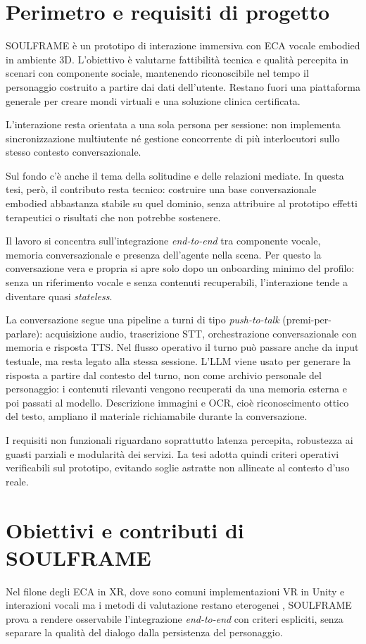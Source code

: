 \section{Perimetro e requisiti di progetto}\label{secperimetro-requisiti}
SOULFRAME è un prototipo di interazione immersiva con ECA vocale embodied in ambiente 3D. L'obiettivo è valutarne fattibilità tecnica e qualità percepita in scenari con componente sociale, mantenendo riconoscibile nel tempo il personaggio costruito a partire dai dati dell'utente. Restano fuori una piattaforma generale per creare mondi virtuali e una soluzione clinica certificata.

L'interazione resta orientata a una sola persona per sessione: non implementa sincronizzazione multiutente né gestione concorrente di più interlocutori sullo stesso contesto conversazionale.

Sul fondo c'è anche il tema della solitudine e delle relazioni mediate. In questa tesi, però, il contributo resta tecnico: costruire una base conversazionale embodied abbastanza stabile su quel dominio, senza attribuire al prototipo effetti terapeutici o risultati che non potrebbe sostenere.

Il lavoro si concentra sull'integrazione \textit{end-to-end} tra componente vocale, memoria conversazionale e presenza dell'agente nella scena. Per questo la conversazione vera e propria si apre solo dopo un onboarding minimo del profilo: senza un riferimento vocale e senza contenuti recuperabili, l'interazione tende a diventare quasi \textit{stateless}.

La conversazione segue una pipeline a turni di tipo \textit{push-to-talk} (premi-per-parlare): acquisizione audio, trascrizione STT, orchestrazione conversazionale con memoria e risposta TTS. Nel flusso operativo il turno può passare anche da input testuale, ma resta legato alla stessa sessione. L'LLM viene usato per generare la risposta a partire dal contesto del turno, non come archivio personale del personaggio: i contenuti rilevanti vengono recuperati da una memoria esterna e poi passati al modello. Descrizione immagini e OCR, cioè riconoscimento ottico del testo, ampliano il materiale richiamabile durante la conversazione.

I requisiti non funzionali riguardano soprattutto latenza percepita, robustezza ai guasti parziali e modularità dei servizi. La tesi adotta quindi criteri operativi verificabili sul prototipo, evitando soglie astratte non allineate al contesto d'uso reale.

\section{Obiettivi e contributi di SOULFRAME}\label{secobiettivi-contributi}
Nel filone degli ECA in XR, dove sono comuni implementazioni VR in Unity e interazioni vocali ma i metodi di valutazione restano eterogenei \cite{Yang2025ECA_XR}, SOULFRAME prova a rendere osservabile l'integrazione \textit{end-to-end} con criteri espliciti, senza separare la qualità del dialogo dalla persistenza del personaggio.

